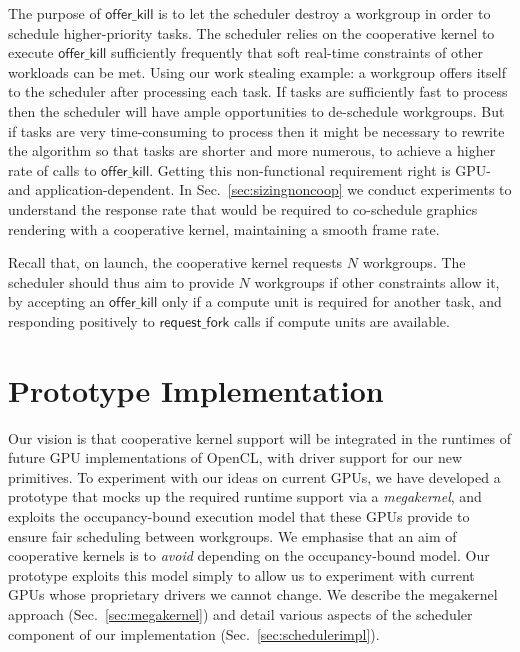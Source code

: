 \documentclass[sigconf]{acmart}
\makeatletter
\renewcommand\paragraph{\@startsection{paragraph}{4}{\z@}%
  {-.5\baselineskip \@plus -2\p@ \@minus -.2\p@}%
  {-3.5\p@}%
  {\bfseries\@parfont}}
\newcommand{\mysec}{Sec.~}
\newcommand{\offerfork}{\mathsf{request\_fork}}
\newcommand{\offerkill}{\mathsf{offer\_kill}}
\makeatother
\begin{document}
{The purpose of $\offerkill$ is to let the scheduler destroy a workgroup
in order to schedule higher-priority tasks.  The scheduler relies on the
cooperative kernel to execute $\offerkill$ sufficiently frequently that
soft real-time constraints of other workloads can be met.
%
Using our work stealing example: a workgroup offers itself to
the scheduler after processing each task.  If tasks are sufficiently
fast to process then the scheduler will have ample opportunities to
de-schedule workgroups.  But if tasks are very time-consuming to
process then it might be necessary to rewrite the algorithm so that
tasks are shorter and more numerous, to achieve a higher rate of calls
to $\offerkill$.
%
Getting this non-functional requirement right is GPU- and
application-dependent.  In \mysec\ref{sec:sizingnoncoop} we conduct
experiments to understand the response rate that would be required to
co-schedule graphics rendering with a cooperative kernel, maintaining
a smooth frame rate.


Recall that, on launch, the cooperative kernel requests $N$ workgroups.
The scheduler should thus aim to provide $N$ workgroups if other constraints allow it,
by accepting an $\offerkill$ only if a compute unit is required for another
task, and responding positively to $\offerfork$ calls if compute units are available.





\section{Prototype Implementation}\label{sec:implementation}

Our vision is that cooperative kernel support will be integrated
in the runtimes of future GPU implementations of OpenCL, with driver
support for our new primitives.  To experiment with our ideas on
current GPUs, we have developed a prototype that mocks up the required
runtime support via a \emph{megakernel}, and exploits the
occupancy-bound execution model that these GPUs provide to ensure fair
scheduling between workgroups.  We emphasise that an aim of
cooperative kernels is to \emph{avoid} depending on the
occupancy-bound model.  Our prototype exploits this model simply to
allow us to experiment with current GPUs whose proprietary drivers we
cannot change.  We describe the megakernel approach
(\mysec\ref{sec:megakernel}) and detail various aspects of the
scheduler component of our implementation
(\mysec\ref{sec:schedulerimpl}).

}
\end{document}

